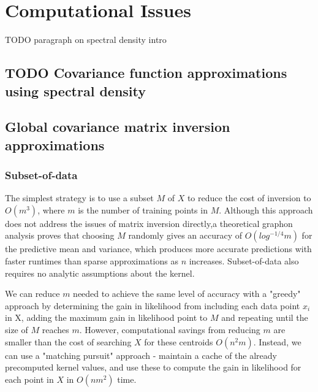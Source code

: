\section{Computational Issues}

TODO paragraph on spectral density intro


\subsection{TODO Covariance function approximations using spectral density \cite{foreman-mackay}}

\subsection{Global covariance matrix inversion approximations \cite{big-data}}

\subsubsection{Subset-of-data}
The simplest strategy is to use a subset $M$ of $X$ to reduce the cost of inversion to $O(m^3)$, where $m$ is the number of training points in $M$. Although this approach does not address the issues of matrix inversion directly,a theoretical graphon analysis proves that choosing $M$ randomly gives an accuracy of $O(log^{-1/4}m)$ for the predictive mean and variance, which produces more accurate predictions with faster runtimes than sparse approximations as $n$ increases. \cite{random-subsampling} Subset-of-data also requires no analytic assumptions about the kernel.


We can reduce $m$ needed to achieve the same level of accuracy with a "greedy" approach by determining the gain in likelihood from including each data point $x_i$ in X, adding the maximum gain in likelihood point to $M$ and repeating until the size of $M$ reaches $m$. However, computational savings from reducing $m$ are smaller than the cost of searching $X$ for these centroids $O(n^2m)$. Instead, we can use a "matching pursuit" approach - maintain a cache of the already precomputed kernel values, and use these to compute the gain in likelihood for each point in $X$ in $O(nm^2)$ time. \cite{matching-pursuit}

